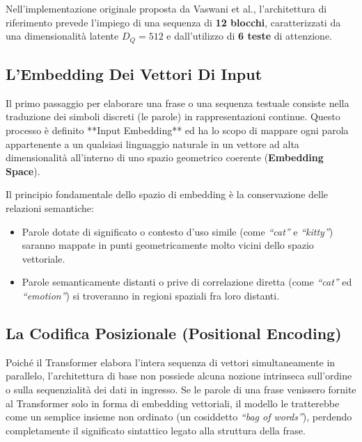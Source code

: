 ﻿\documentclass[11pt, a4paper]{article}
\begin{document}
Nell'implementazione originale proposta da Vaswani et al., l'architettura di riferimento prevede l'impiego di una sequenza di \textbf{12 blocchi}, caratterizzati da una dimensionalità latente $D_Q = 512$ e dall'utilizzo di \textbf{6 teste} di attenzione.


\subsection{L'Embedding Dei Vettori Di Input}

Il primo passaggio per elaborare una frase o una sequenza testuale consiste nella traduzione dei simboli discreti (le parole) in rappresentazioni continue. Questo processo è definito **Input Embedding** ed ha lo scopo di mappare ogni parola appartenente a un qualsiasi linguaggio naturale in un vettore ad alta dimensionalità all'interno di uno spazio geometrico coerente (\textbf{Embedding Space}).


Il principio fondamentale dello spazio di embedding è la conservazione delle relazioni semantiche:
\begin{itemize}
    \item Parole dotate di significato o contesto d'uso simile (come \emph{``cat''} e \emph{``kitty''}) saranno mappate in punti geometricamente molto vicini dello spazio vettoriale.
    \item Parole semanticamente distanti o prive di correlazione diretta (come \emph{``cat''} ed \emph{``emotion''}) si troveranno in regioni spaziali fra loro distanti.
\end{itemize}

\subsection{La Codifica Posizionale (Positional Encoding)}

Poiché il Transformer elabora l'intera sequenza di vettori simultaneamente in parallelo, l'architettura di base non possiede alcuna nozione intrinseca sull'ordine o sulla sequenzialità dei dati in ingresso. Se le parole di una frase venissero fornite al Transformer solo in forma di embedding vettoriali, il modello le tratterebbe come un semplice insieme non ordinato (un cosiddetto \emph{``bag of words''}), perdendo completamente il significato sintattico legato alla struttura della frase.
\end{document}

